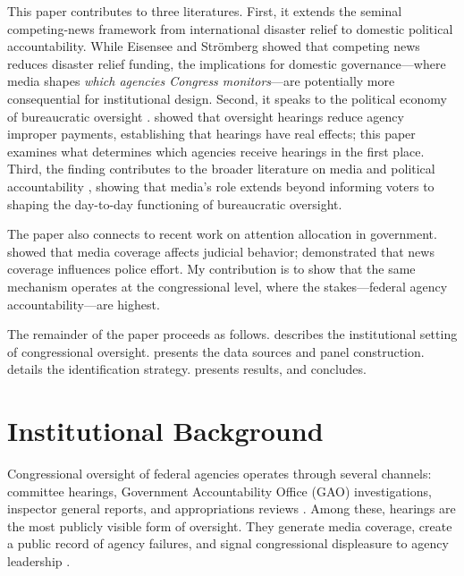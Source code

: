 \documentclass[12pt]{article}
\begin{document}
This paper contributes to three literatures. First, it extends the seminal \citet{eisensee2007news} competing-news framework from international disaster relief to domestic political accountability. While Eisensee and Str\"{o}mberg showed that competing news reduces disaster relief funding, the implications for domestic governance---where media shapes \textit{which agencies Congress monitors}---are potentially more consequential for institutional design. Second, it speaks to the political economy of bureaucratic oversight \citep{mccubbins1984congressional, weingast1984congressional}. \citet{ban2023oversight} showed that oversight hearings reduce agency improper payments, establishing that hearings have real effects; this paper examines what determines which agencies receive hearings in the first place. Third, the finding contributes to the broader literature on media and political accountability \citep{besley2006handcuffed, snyder2010press, durante2018political}, showing that media's role extends beyond informing voters to shaping the day-to-day functioning of bureaucratic oversight.

The paper also connects to recent work on attention allocation in government. \citet{lim2015judge} showed that media coverage affects judicial behavior; \citet{mastrorocco2020political} demonstrated that news coverage influences police effort. My contribution is to show that the same mechanism operates at the congressional level, where the stakes---federal agency accountability---are highest.

The remainder of the paper proceeds as follows.  describes the institutional setting of congressional oversight.  presents the data sources and panel construction.  details the identification strategy.  presents results, and  concludes.


\section{Institutional Background}
\label{sec:background}

Congressional oversight of federal agencies operates through several channels: committee hearings, Government Accountability Office (GAO) investigations, inspector general reports, and appropriations reviews \citep{aberbach1990keeping}. Among these, hearings are the most publicly visible form of oversight. They generate media coverage, create a public record of agency failures, and signal congressional displeasure to agency leadership \citep{ogul1990congressional}.
\end{document}
